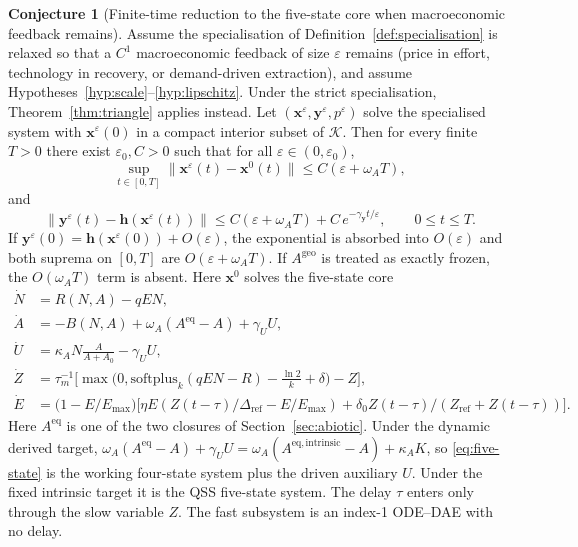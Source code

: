 \documentclass[11pt]{article}
\theoremstyle{definition}
\newtheorem{conjecture}{Conjecture}
\begin{document}
\begin{conjecture}[Finite-time reduction to the five-state core when macroeconomic feedback remains]
\label{thm:tikhonov}
Assume the specialisation of Definition~\ref{def:specialisation} is relaxed so that a $C^1$ macroeconomic feedback of size $\varepsilon$ remains (price in effort, technology in recovery, or demand-driven extraction), and assume Hypotheses~\ref{hyp:scale}--\ref{hyp:lipschitz}. Under the strict specialisation, Theorem~\ref{thm:triangle} applies instead. Let $(\mathbf x^\varepsilon,\mathbf y^\varepsilon,p^\varepsilon)$ solve the specialised system with $\mathbf x^\varepsilon(0)$ in a compact interior subset of $\mathcal K$. Then for every finite $T>0$ there exist $\varepsilon_0,C>0$ such that for all $\varepsilon\in(0,\varepsilon_0)$,
\begin{equation}
\sup_{t\in[0,T]}\bigl\|\mathbf x^\varepsilon(t)-\mathbf x^0(t)\bigr\|
\le C(\varepsilon+\omega_A T),
\end{equation}
and
\begin{equation}
\bigl\|\mathbf y^\varepsilon(t)-\mathbf h(\mathbf x^\varepsilon(t))\bigr\|
\le C(\varepsilon+\omega_A T)+C\,e^{-\gamma_{\mathbf y}t/\varepsilon},
\qquad 0\le t\le T.
\end{equation}
If $\mathbf y^\varepsilon(0)=\mathbf h(\mathbf x^\varepsilon(0))+O(\varepsilon)$, the exponential is absorbed into $O(\varepsilon)$ and both suprema on $[0,T]$ are $O(\varepsilon+\omega_A T)$. If $A^{\mathrm{geo}}$ is treated as exactly frozen, the $O(\omega_A T)$ term is absent. Here $\mathbf x^0$ solves the five-state core
\begin{equation}
\begin{aligned}
\dot N&=R(N,A)-qEN,\\
\dot A&=-B(N,A)+\omega_A(A^{\mathrm{eq}}-A)+\gamma_U U,\\
\dot U&=\kappa_A N\tfrac{A}{A+A_0}-\gamma_U U,\\
\dot Z&=\tau_m^{-1}\bigl[\max\bigl(0,\mathrm{softplus}_k(qEN-R)-\tfrac{\ln 2}{k}+\delta\bigr)-Z\bigr],\\
\dot E&=\bigl(1-E/E_{\max}\bigr)\bigl[\eta E(Z(t-\tau)/\Delta_{\mathrm{ref}}-E/E_{\max})+\delta_0 Z(t-\tau)/(Z_{\mathrm{ref}}+Z(t-\tau))\bigr].
\end{aligned}
\label{eq:five-state}
\end{equation}
Here $A^{\mathrm{eq}}$ is one of the two closures of Section~\ref{sec:abiotic}. Under the dynamic derived target, $\omega_A(A^{\mathrm{eq}}-A)+\gamma_U U=\omega_A(A^{\mathrm{eq,intrinsic}}-A)+\kappa_A K$, so \eqref{eq:five-state} is the working four-state system plus the driven auxiliary $U$. Under the fixed intrinsic target it is the QSS five-state system. The delay $\tau$ enters only through the slow variable $Z$. The fast subsystem is an index-1 ODE--DAE with no delay.
\end{conjecture}
\end{document}
